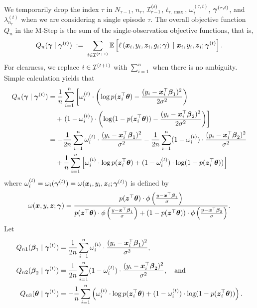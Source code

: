 We temporarily drop the index $\tau$ in $N_{\tau-1}$, $n_{\tau}$, ${\cal I}_{\tau-1}^{(t)}$, $t_{\tau, \max}$, $\omega_i^{(\tau, t)}$, $\boldsymbol{\gamma}^{(\tau, t)}$, and $\lambda_{n_{\tau}}^{(t)}$ when we are considering a single episode $\tau$. 
 The overall objective function $Q_n$ in the M-Step is the sum of the single-observation objective functions, that is, 
\begin{equation}
    Q_n(\boldsymbol{\gamma} \;|\; \boldsymbol{\gamma}^{(t)})
    \; := \; 
    \sum_{i \in {\cal I}^{(t+1)}}\mathbb{E}\left[  \ell\left( \boldsymbol{x}_i, y_i, \boldsymbol{z}_i, g_i; \boldsymbol{\gamma} \right) \;|\; \boldsymbol{x}_i, y_i, \boldsymbol{z}_i; \boldsymbol{\gamma}^{(t)} \right].
\end{equation}
For clearness, we replace $i \in {\cal I}^{(t+1)}$ with $\sum_{i=1}^{n}$ when there is no ambiguity.
Simple calculation yields that 
\begin{align}\label{eqn:Qn}
    Q_n(\boldsymbol{\gamma} \;|\; \boldsymbol{\gamma}^{(t)})
    & = 
   \frac{1}{n} \sum_{i=1}^{n} \left[\omega_i^{(t)}\cdot \left(  \log p(\boldsymbol{z}_i^\top\boldsymbol{\theta})-
    \frac{(y_i - \boldsymbol{x}_i^\top\boldsymbol{\beta}_1)^2 }{2\sigma^2 } \right) \right.   \\
    &\quad +
    \left. (1- \omega_i^{(t)}) \cdot \left( \log(1-p(\boldsymbol{z}_i^\top\boldsymbol{\theta})) -
    \frac{(y_i - \boldsymbol{x}_i^\top\boldsymbol{\beta}_2)^2}{2\sigma^2} \right) \right]  \nonumber \\
   & = -  \frac{1}{2n} \sum_{i=1}^{n} \omega_i^{(t)} \cdot  \frac{(y_i - \boldsymbol{x}_i^\top\boldsymbol{\beta}_1)^2 }{\sigma^2} - \frac{1}{2n} \sum_{i=1}^{n} (1- \omega_i^{(t)}) \cdot \frac{(y_i - \boldsymbol{x}_i^\top\boldsymbol{\beta}_2)^2 }{\sigma^2}  \nonumber   \\
   & \quad + \frac{1}{n} \sum_{i=1}^{n}\left[ \omega_i^{(t)} \cdot \log p(\boldsymbol{z}_i^\top\boldsymbol{\theta}) + (1- \omega_i^{(t)}) \cdot \log(1-p(\boldsymbol{z}_i^\top\boldsymbol{\theta}))\right]  \nonumber 
\end{align}
where $\omega_i^{(t)} = \omega_i(\boldsymbol{\gamma}^{(t)}) = \omega(\boldsymbol{x}_i, y_i, \boldsymbol{z}_i ; \boldsymbol{\gamma}^{(t)})$ is defined by
\[
\omega(\boldsymbol{x}, y, \boldsymbol{z} ; \boldsymbol{\gamma}) 
= \frac{p(\boldsymbol{z}^\top\boldsymbol{\theta}) \cdot
	    \phi\left( \frac{y - \boldsymbol{x}^\top\boldsymbol{\beta}_1}{\sigma} \right)}{p(\boldsymbol{z}^\top\boldsymbol{\theta}) \cdot \phi\left( \frac{y - \boldsymbol{x}^\top\boldsymbol{\beta}_1}{\sigma} \right) 
	    + \left( 1-p(\boldsymbol{z}^\top\boldsymbol{\theta}) \right) \cdot \phi\left( \frac{y - \boldsymbol{x}^\top\boldsymbol{\beta}_2}{\sigma} \right)}.
\]
Let 
\begin{equation} %
\begin{aligned}
    Q_{n1}(\bbeta_1 \cond \bgamma^{(t)}) & =  \frac{1}{2n} \sum_{i=1}^{n} \omega_i^{(t)}\cdot  \frac{(y_i - \bx_i^\top\bbeta_1)^2 }{\sigma^2}, \\
    Q_{n2}(\bbeta_2 \cond \bgamma^{(t)}) & =  \frac{1}{2n} \sum_{i=1}^{n} (1- \omega_i^{(t)}) \cdot \frac{(y_i - \bx_i^\top\bbeta_2)^2 }{\sigma^2}, \quad\text{and}\quad \\
    Q_{n3}(\btheta \cond \bgamma^{(t)}) & = - \frac{1}{n} \sum_{i=1}^{n} \paren{ \omega_i^{(t)} \cdot \log p(\bz_i^\top\btheta) + (1- \omega_i^{(t)}) \cdot \log(1-p(\bz_i^\top\btheta)) }.
\end{aligned}
\end{equation}
